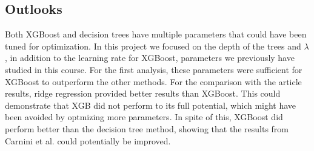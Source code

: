 \documentclass[numberedappendix, twocolappendix]{emulateapj}
\begin{document}
\subsection{Outlooks}

Both XGBoost and decision trees have multiple parameters that could have been tuned for optimization. In this project we focused on the depth of the trees and $\lambda$, in addition to the learning rate for XGBoost, parameters we previously have studied in this course. For the first analysis, these parameters were sufficient for XGBoost to outperform the other methods. For the comparison with the article results, ridge regression provided better results than XGBoost. This could demonstrate that XGB did not perform to its full potential, which might have been avoided by optmizing more parameters. In spite of this, XGBoost did perform better than the decision tree method, showing that the results from Carnini et al. \cite{trees in nuclear} could potentially be improved.
\end{document}
